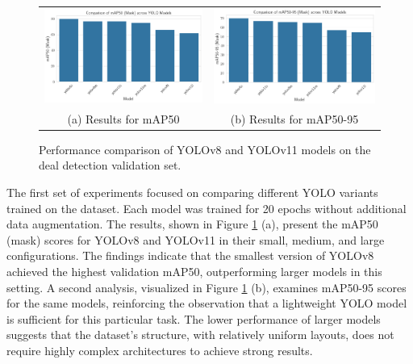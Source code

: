 \documentclass[11pt]{article}
\begin{document}
\begin{figure}[h!]
    \centering
    \begin{tabular}{cc}
    \includegraphics[width=0.5\linewidth]{figures/deal_detection/map50_all_yolo.png} &   \includegraphics[width=0.5\linewidth]{figures/deal_detection/map50_95_all_yolo.png} \\
    (a) Results for mAP50 & (b) Results for mAP50-95 \\[2pt]
    \end{tabular}
    \caption{Performance comparison of YOLOv8 and YOLOv11 models on the deal detection validation set.}
    \label{fig:all_yolo_results}
\end{figure}

The first set of experiments focused on comparing different YOLO variants trained on the dataset. Each model was trained for 20 epochs without additional data augmentation. The results, shown in Figure \ref{fig:all_yolo_results} (a), present the mAP50 (mask) scores for YOLOv8 and YOLOv11 in their small, medium, and large configurations. The findings indicate that the smallest version of YOLOv8 achieved the highest validation mAP50, outperforming larger models in this setting. A second analysis, visualized in Figure \ref{fig:all_yolo_results} (b), examines mAP50-95 scores for the same models, reinforcing the observation that a lightweight YOLO model is sufficient for this particular task. The lower performance of larger models suggests that the dataset’s structure, with relatively uniform layouts, does not require highly complex architectures to achieve strong results.
\end{document}
